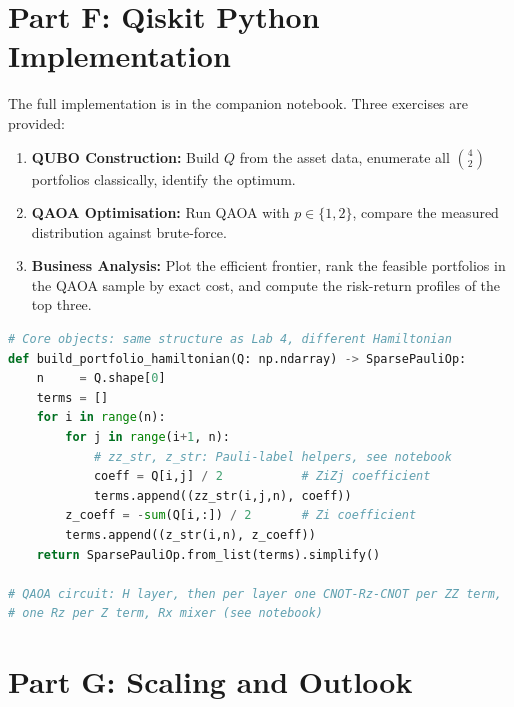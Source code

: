 \documentclass[a4paper,11pt]{article}
\begin{document}
\section{Part F: Qiskit Python Implementation}

The full implementation is in the companion notebook. Three exercises
are provided:

\begin{enumerate}
    \item \textbf{QUBO Construction:} Build $Q$ from the asset data,
          enumerate all $\binom{4}{2}$ portfolios classically, identify
          the optimum.
    \item \textbf{QAOA Optimisation:} Run QAOA with $p \in \{1,2\}$,
          compare the measured distribution against brute-force.
    \item \textbf{Business Analysis:} Plot the efficient frontier, rank
          the feasible portfolios in the QAOA sample by exact cost, and
          compute the risk-return profiles of the top three.
\end{enumerate}

\begin{tcolorbox}[colback=green!5!white,colframe=green!75!black,
    title=Key Code Structure, fonttitle=\bfseries]
\begin{lstlisting}[language=Python]
# Core objects: same structure as Lab 4, different Hamiltonian
def build_portfolio_hamiltonian(Q: np.ndarray) -> SparsePauliOp:
    n     = Q.shape[0]
    terms = []
    for i in range(n):
        for j in range(i+1, n):
            # zz_str, z_str: Pauli-label helpers, see notebook
            coeff = Q[i,j] / 2           # ZiZj coefficient
            terms.append((zz_str(i,j,n), coeff))
        z_coeff = -sum(Q[i,:]) / 2       # Zi coefficient
        terms.append((z_str(i,n), z_coeff))
    return SparsePauliOp.from_list(terms).simplify()

# QAOA circuit: H layer, then per layer one CNOT-Rz-CNOT per ZZ term,
# one Rz per Z term, Rx mixer (see notebook)
\end{lstlisting}
\end{tcolorbox}

\section{Part G: Scaling and Outlook}
\end{document}

